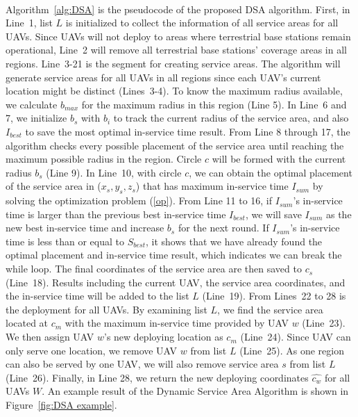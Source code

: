 \documentclass[a4paper,12pt]{report}
\begin{document}
\paragraph{}
Algorithm~\ref{alg:DSA} is the pseudocode of the proposed DSA algorithm. First, in Line~1, list $L$ is initialized to collect the information of all service areas for all UAVs. Since UAVs will not deploy to areas where terrestrial base stations remain operational, Line~2 will remove all terrestrial base stations' coverage areas in all regions. Line~3-21 is the segment for creating service areas. The algorithm will generate service areas for all UAVs in all regions since each UAV's current location might be distinct (Lines~3-4). To know the maximum radius available, we calculate $b_{max}$ for the maximum radius in this region (Line 5). In Line~6 and 7, we initialize $b_s$ with $b_i$ to track the current radius of the service area, and also $I_{best}$ to save the most optimal in-service time result. From Line 8 through 17, the algorithm checks every possible placement of the service area until reaching the maximum possible radius in the region. Circle $c$ will be formed with the current radius $b_s$ (Line 9). In Line~10, with circle $c$, we can obtain the optimal placement of the service area in ($x_s, y_s, z_s$) that has maximum in-service time $I_{sum}$ by solving the optimization problem (\ref{op}). From Line 11 to 16, if $I_{sum}$'s in-service time is larger than the previous best in-service time $I_{best}$, we will save $I_{sum}$ as the new best in-service time and increase $b_{s}$ for the next round. If $I_{sum}$'s in-service time is less than or equal to $S_{best}$, it shows that we have already found the optimal placement and in-service time result, which indicates we can break the while loop. The final coordinates of the service area are then saved to $c_s$ (Line~18). Results including the current UAV, the service area coordinates, and the in-service time will be added to the list $L$ (Line~19). From Lines~22 to 28 is the deployment for all UAVs. By examining list $L$, we find the service area located at $c_m$ with the maximum in-service time provided by UAV $w$ (Line~23). We then assign UAV $w$'s new deploying location as $c_m$ (Line~24). Since UAV can only serve one location, we remove UAV $w$ from list $L$ (Line~25). As one region can also be served by one UAV, we will also remove service area $s$ from list $L$ (Line~26). Finally, in Line 28, we return the new deploying coordinates $\hat{c_{w}}$ for all UAVs $W$. An example result of the Dynamic Service Area Algorithm is shown in Figure~\ref{fig:DSA example}.
\end{document}
